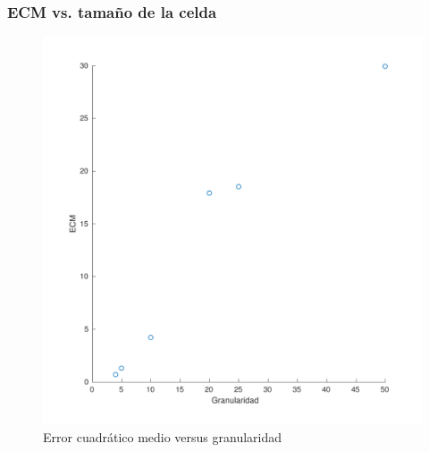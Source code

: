 \documentclass[11pt]{beamer}
\begin{document}
\begin{frame}
\frametitle{ECM vs. tamaño de la celda}
\begin{figure}
\centering
        \includegraphics[scale=0.4]{img/granu_ecm-eps-converted-to.pdf}
        \caption{Error cuadrático medio versus granularidad}
        \label{fig:ECM vs granularidad}
\end{figure}
\end{frame}
\end{document}
